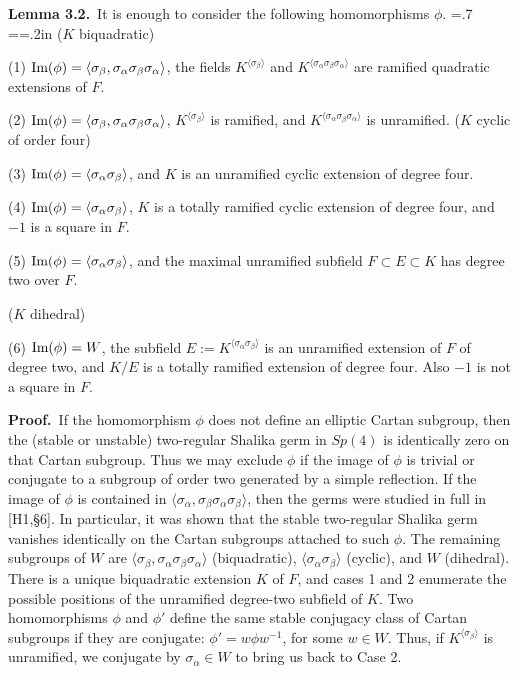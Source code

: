 \bigskip
\noindent
{
{\bf Lemma 3.2.}\   It is enough to consider the following
homomorphisms $\phi$. 
\parindent=0pt \parskip=.7\parskip
\everypar={\hangindent=.2in}
\smallskip
($K$ biquadratic)

(1) $\hbox{Im}(\phi)=\langle\sigma_\beta,\sigma_\alpha\sigma_\beta
   \sigma_\alpha\rangle$, the fields
   $K^{\langle\sigma_\beta\rangle}$ and $K^{\langle
       \sigma_\alpha\sigma_\beta\sigma_\alpha\rangle}$ are
  ramified quadratic extensions of $F$.

(2) $\hbox{Im}(\phi)=\langle\sigma_\beta,\sigma_\alpha\sigma_\beta
   \sigma_\alpha\rangle$,
   $K^{\langle\sigma_\beta\rangle}$ is ramified, and $K^{\langle
       \sigma_\alpha\sigma_\beta\sigma_\alpha\rangle}$ is unramified.
\smallskip
($K$ cyclic of order four)

(3)  $\hbox{Im}(\phi)=\langle\sigma_\alpha\sigma_\beta\rangle$, and $K$
 is an unramified cyclic extension of degree four.

(4)   $\hbox{Im}(\phi)=\langle\sigma_\alpha\sigma_\beta\rangle$, $K$
 is a totally ramified cyclic extension of degree four, and
$-1$ is a square in $F$.

(5)  $\hbox{Im}(\phi)=\langle\sigma_\alpha\sigma_\beta\rangle$, and the
 maximal unramified subfield 
 $F\subset E\subset K$ has degree two over $F$.

\smallskip
($K$ dihedral)

(6)  $\hbox{Im}(\phi) = W$, the subfield 
$E:= K^{\langle\sigma_\alpha\sigma_\beta\rangle}$
is an unramified extension of $F$ of degree two, and $K/E$ is a
totally ramified extension of degree four.
Also $-1$ is not a square in $F$.
\par

}

\bigskip
\noindent
{\bf Proof.}\   If the homomorphism $\phi$ does not define an elliptic
Cartan subgroup, then the (stable or unstable)
two-regular Shalika germ in $Sp(4)$ is identically zero on that
Cartan subgroup.  Thus we may exclude $\phi$ if the image of $\phi$
is trivial or conjugate to a subgroup of order two generated by
a simple reflection.  If the image of $\phi$ is contained in
$\langle\sigma_\alpha,\sigma_\beta\sigma_\alpha\sigma_\beta\rangle$,
then the germs were studied in full in [H1,\S6].  In particular,
it was shown that the stable two-regular Shalika germ vanishes
identically on the Cartan subgroups attached to such $\phi$.
The remaining subgroups of $W$ are $\langle\sigma_\beta,
\sigma_\alpha\sigma_\beta\sigma_\alpha\rangle$ (biquadratic),
$\langle\sigma_\alpha\sigma_\beta\rangle$ (cyclic), and $W$ (dihedral).
There is a unique biquadratic extension
$K$ of $F$, and cases 1 and 2 enumerate the possible positions
of the unramified degree-two subfield of $K$.  Two homomorphisms
$\phi$ and $\phi'$ define the same stable conjugacy class of
Cartan subgroups if they are conjugate: $\phi'=w\phi w^{-1}$, for
some $w\in W$.  Thus, if $K^{\langle\sigma_\beta
\rangle}$ is unramified, we conjugate by $\sigma_\alpha\in W$ to bring
us back to Case 2.

